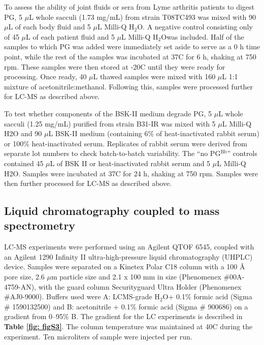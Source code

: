 \documentclass[twoside, watermark]{zHenriquesLab-StyleBioRxiv}
\newcommand{\HtwoO}{H$_\text{2}$O} %
\newcommand{\tmu}{$\mu$} %
\newcommand{\pgbb}{PG$^\text{Bb}$}
\begin{document}
\vspace{1mm}
To assess the ability of joint fluids or sera from Lyme arthritis patients to digest PG, 5 \tmu L whole sacculi (1.73 mg/mL) from strain T08TC493 was mixed with 90 \tmu L of each body fluid and 5 \tmu L Milli-Q \HtwoO. A negative control consisting only of 45 \tmu L of each patient fluid and 5 \tmu L Milli-Q \HtwoO was included. Half of the samples to which PG was added were immediately set aside to serve as a 0 h time point, while the rest of the samples was incubated at 37\degree C for 6 h, shaking at 750 rpm. These samples were then stored at -20\degree C until they were ready for processing. Once ready, 40 \tmu L thawed samples were mixed with 160 \tmu L 1:1 mixture of acetonitrile:methanol. Following this, samples were processed further for LC-MS as described above.

\vspace{1mm}
To test whether components of the BSK-II medium degrade PG, 5 \tmu L whole sacculi (1.25 mg/mL) purified from strain B31-IR was mixed with 5 \tmu L Milli-Q H2O and 90 \tmu L BSK-II medium (containing 6\% of heat-inactivated rabbit serum) or 100\% heat-inactivated serum. Replicates of rabbit serum were derived from separate lot numbers to check batch-to-batch variability. The “no \pgbb ” controls contained 45 \tmu L of BSK II or heat-inactivated rabbit serum and 5 \tmu L Milli-Q H2O. Samples were incubated at 37\degree C for 24 h, shaking at 750 rpm. Samples were then further processed for LC-MS as described above.

\subsection*{Liquid chromatography coupled to mass spectrometry}
LC-MS experiments were performed using an Agilent QTOF 6545, coupled with an Agilent 1290 Infinity II ultra-high-pressure liquid chromatography (UHPLC) device. Samples were separated on a Kinetex Polar C18 column with a 100 {\AA} pore size, 2.6 \tmu m particle size and 2.1 x 100 mm in size (Phenomenex \#00A-4759-AN), with the guard column Securityguard Ultra Holder (Phenomenex \#AJ0-9000). Buffers used were A: LCMS-grade \HtwoO + 0.1\% formic acid (Sigma \# 1590132500) and B: acetonitrile + 0.1\% formic acid (Sigma \# 900686) on a gradient from 0–95\% B. The gradient for the LC experiments is described in \textbf{Table \ref{fig: figS3}}. The column temperature was maintained at 40\degree C during the experiment. Ten microliters of sample were injected per run.
\end{document}
